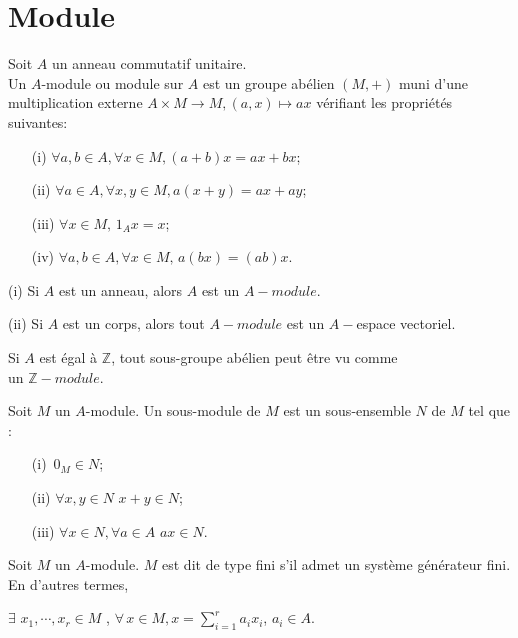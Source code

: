 \section{Module}
\begin{madefinition}
	Soit $A$ un anneau commutatif unitaire.\\
	Un $A$-module ou module sur $A$ est un groupe abélien $(M,+)$ muni d'une multiplication externe $A \times M \rightarrow M, (a,x) \mapsto ax$ vérifiant les propriétés suivantes:
	\begin{enumerate}
		\item[(i)]$ \forall a, b \in A, \forall x \in M,(a+b)x = ax+bx$;
		\item[(ii)] $ \forall a \in A, \forall x, y \in M,a(x+y) = ax+ay$;
		\item[(iii)] $ \forall x \in M, \,1_A x = x$;
		\item[(iv)] $\forall a, b \in A, \forall x \in M, \, a(bx)=(ab)x$.
	\end{enumerate}
\end{madefinition}
\begin{maremarque}
		\item[(i)] Si $A$ est un anneau, alors $A$ est un $A-module$.
		\item[(ii)] Si $A$ est un corps, alors tout $A-module$ est un $A-$espace vectoriel.
\end{maremarque}
\begin{monexemple}
		\item Si $A$ est égal à $\mathbb{Z}$, tout sous-groupe abélien peut être vu comme \\ un $\mathbb{Z}-module.$
\end{monexemple}
\begin{madefinition}
	Soit $M$ un $A$-module. Un sous-module de $M$ est un sous-ensemble $N$ de $M$ tel que :
	\begin{enumerate}
		\item[(i)]$ \, 0_M \in N$;
		\item[(ii)]$ \forall x, y \in N \, \, x+y \in N$;
		\item[(iii)] $\forall x \in N, \forall a \in A \, \, ax \in N$.
	\end{enumerate}
\end{madefinition}
\begin{madefinition}
	Soit $M$ un $A$-module. $M$ est dit de type fini s'il admet un système générateur fini. En d'autres termes,
\begin{center}
		 $\exists  \, \, x_1, \cdots ,x_r \in M$ , $\forall \,  x \in M, x = \displaystyle \sum_{i=1}^{r}{a_i x_i}$, $a_i \in A$.
\end{center}
	 
\end{madefinition}

